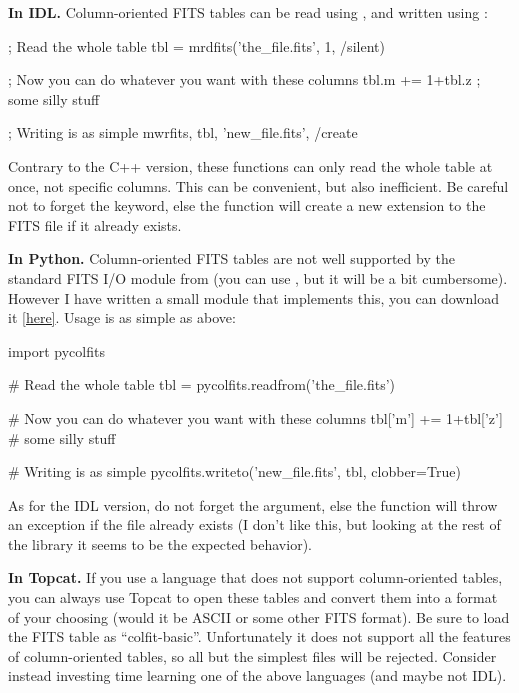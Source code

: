 \documentclass[12pt,a4paper]{article}
\begin{document}
{\bf In IDL.} Column-oriented FITS tables can be read using , and written using :
\begin{idlcode}
; Read the whole table
tbl = mrdfits('the_file.fits', 1, /silent)

; Now you can do whatever you want with these columns
tbl.m += 1+tbl.z ; some silly stuff

; Writing is as simple
mwrfits, tbl, 'new_file.fits', /create
\end{idlcode}
Contrary to the C++ version, these functions can only read the whole table at once, not specific columns. This can be convenient, but also inefficient. Be careful not to forget the  keyword, else the function will create a new extension to the FITS file if it already exists.

{\bf In Python.} Column-oriented FITS tables are not well supported by the standard FITS I/O module from  (you can use , but it will be a bit cumbersome). However I have written a small module that implements this, you can download it \href{https://github.com/cschreib/phypp/blob/master/python/pycolfits.py}{[here]}. Usage is as simple as above:
\begin{pythoncode}
import pycolfits

# Read the whole table
tbl = pycolfits.readfrom('the_file.fits')

# Now you can do whatever you want with these columns
tbl['m'] += 1+tbl['z'] # some silly stuff

# Writing is as simple
pycolfits.writeto('new_file.fits', tbl, clobber=True)
\end{pythoncode}
As for the IDL version, do not forget the  argument, else the function will throw an exception if the file already exists (I don't like this, but looking at the rest of the  library it seems to be the expected behavior).

{\bf In Topcat.} If you use a language that does not support column-oriented tables, you can always use Topcat to open these tables and convert them into a format of your choosing (would it be ASCII or some other FITS format). Be sure to load the FITS table as ``colfit-basic''. Unfortunately it does not support all the features of column-oriented tables, so all but the simplest files will be rejected. Consider instead investing time learning one of the above languages (and maybe not IDL).
\end{document}
